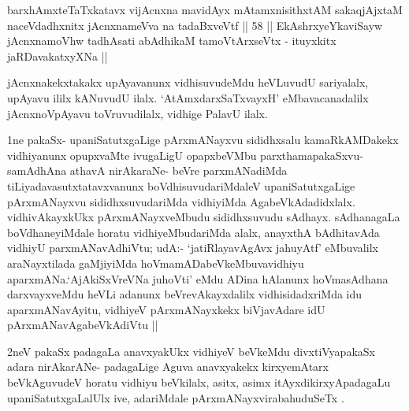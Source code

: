 \begin{shl}
barxhAmxteTaTxkatavx vijAcnxna mavidAyx mAtamxnisithxtAM
sakaqjAjxtaM naceVdadhxnitx jAcnxnameVva na tadaBxveVtf || 58 ||
EkAshrxyeYkaviSayw jAcnxnamoVhw tadhAsati
abAdhikaM tamoV\s tArxseVtx - ituyxkitx jaRDavakatxyXNa ||
\end{shl}

\begin{artha}
jAcnxnakekxtakakx upAyavanunx vidhisuvudeMdu heVLuvudU sariyalalx,
\-upAyavu ililx kANuvudU ilalx. `AtAmxdarxSaTxvayxH' eMbavacanadalilx 
\-jAcnxnoVpAyavu toVruvudilalx, vidhige PalavU ilalx.
\end{artha}

\centerline{}

\begin{artha}
1ne pakaSx- upaniSatutxgaLige pArxmANayxvu sididhxsalu kamaRkAMDakekx
vidhi\-yanunx opupxvaMte ivugaLigU opapxbeVMbu parxthamapakaSxvu-
samAdhAna athavA nirAkaraNe- beVre parxmANadiMda
tiLiyadavasutxtatavxvanunx boVdhisuvudariMdaleV upaniSatutx\-gaLige
pArxmANayxvu sididhxsuvudariMda vidhiyiMda
AgabeVkAdadidxlalx. vidhivAkayxkUkx pArxmANayxveMbudu sididhxsuvudu
sAdhayx. sAdhanagaLa boVdhaneyiMdale \-horatu vidhiyeMbudariMda alalx,
anayxthA bAdhitavAda vidhiyU parxmANavAdhiVtu; \break udA:- `jatiRlayavAgAvx {ja}huyAtf'
eMbuvalilx araNayxtilada gaMjiyiMda \break hoVmamADabeVkeMbuvavidhiyu
aparxmANa.`AjAkiSxVreVNa juhoVti' eMdu \-ADina hAlanunx hoVmasAdhana darxvayxveMdu
heVLi adanunx beVrevAkayxdalilx vidhisidadx\-riMda idu aparxmANavAyitu,
vidhiyeV pArxmANayxkekx biVjavAdare idU \break pArxmANavAgabeVkAdiVtu ||
\end{artha}

\begin{artha}
2neV pakaSx padagaLa anavxyakUkx vidhiyeV beVkeMdu divxtiVyapakaSx adara nirAkarANe- padagaLige Aguva anavxyakekx kirxyemAtarx beVkAguvudeV horatu vidhiyu beVkilalx, asitx, asimx itAyxdikirxyApadagaLu upaniSatutxgaLalUlx ive, adariMdale pArxmANayxvirabahuduSeTx .
\end{artha}

